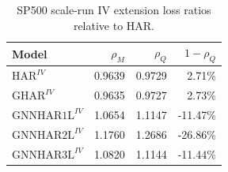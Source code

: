 \begin{table}[H]
\centering
\small
\begin{tabular}{lrrr}
\toprule
Model & \(\rho_M\) & \(\rho_Q\) & \(1-\rho_Q\) \\
\midrule
\(\mathrm{HAR}^{IV}\) & 0.9639 & 0.9729 & 2.71\% \\
\(\mathrm{GHAR}^{IV}\) & 0.9635 & 0.9727 & 2.73\% \\
\(\mathrm{GNNHAR1L}^{IV}\) & 1.0654 & 1.1147 & -11.47\% \\
\(\mathrm{GNNHAR2L}^{IV}\) & 1.1760 & 1.2686 & -26.86\% \\
\(\mathrm{GNNHAR3L}^{IV}\) & 1.0820 & 1.1144 & -11.44\% \\
\bottomrule
\end{tabular}
\caption{SP500 scale-run IV extension loss ratios relative to HAR.}
\label{tab:sp500-iv-loss}
\end{table}
